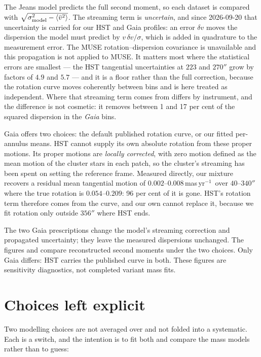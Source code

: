 \documentclass[11pt,a4paper]{article}
\newcommand{\masyr}{mas\,yr$^{-1}$}
\begin{document}
The Jeans model predicts the full second moment, so each dataset is compared with
$\sqrt{\sigma_{\rm model}^2-\langle\bar v^2\rangle}$. The streaming term is \emph{uncertain},
and since 2026-09-20 that uncertainty is carried for our HST and Gaia profiles: an error $\delta v$ moves the dispersion
the model must predict by $v\,\delta v/\sigma$, which is added in quadrature to the
measurement error. The MUSE rotation--dispersion covariance is unavailable and this
propagation is not applied to MUSE. It matters most where the statistical errors are smallest --- the HST
tangential uncertainties at $223$ and $270''$ grow by factors of $4.9$ and $5.7$ --- and it
is a floor rather than the full correction, because the rotation curve moves coherently
between bins and is here treated as independent. Where that streaming term comes from
differs by instrument, and the difference is not cosmetic: it removes between 1 and 17 per
cent of the squared dispersion in the \emph{Gaia} bins.

Gaia offers two choices: the default published rotation curve, or our fitted per-annulus
means. HST cannot supply its own absolute rotation from these proper motions.
Its proper motions are \emph{locally corrected}, with zero motion defined as the mean motion
of the cluster stars in each patch, so the cluster's streaming has been spent on setting the
reference frame. Measured directly, our mixture recovers a residual mean tangential motion of
$0.002$--$0.008$\,\masyr\ over $40$--$340''$ where the true rotation is $0.054$--$0.209$:
96 per cent of it is gone. HST's rotation term therefore comes from the
\citet{vasiliev2021} curve, and our own cannot replace it, because we fit rotation only
outside $356''$ where HST ends.

The two Gaia prescriptions change the model's streaming correction and propagated
uncertainty; they leave the measured dispersions unchanged. The figures
 and
 compare reconstructed second moments under
the two choices. Only Gaia differs: HST carries the published curve in both. These
figures are sensitivity diagnostics, not completed variant mass fits.

\section{Choices left explicit}

Two modelling choices are not averaged over and not folded into a systematic. Each is a
switch, and the intention is to fit both and compare the mass models rather than to guess:
\end{document}
